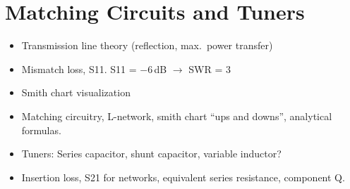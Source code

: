 \section{Matching Circuits and Tuners}
\label{sec:tuners}


\begin{itemize}
\item Transmission line theory (reflection, max.\ power transfer)
\item Mismatch loss, S11. S11 = $-6$\,dB $\rightarrow$ SWR = 3
\item Smith chart visualization
\item Matching circuitry, L-network, smith chart ``ups and downs'', analytical formulas.
\item Tuners: Series capacitor, shunt capacitor, variable inductor?
\item Insertion loss, S21 for networks, equivalent series resistance, component Q.
\end{itemize}
